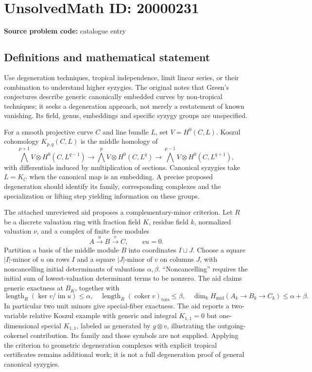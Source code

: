 \documentclass[11pt]{article}
\begin{document}
\section*{UnsolvedMath ID: 20000231}
\textbf{Source problem code:} catalogue entry
\subsection{Definitions and mathematical statement}
Use degeneration techniques, tropical independence, limit linear series, or their combination to understand higher syzygies. The original notes that Green's conjectures describe generic canonically embedded curves by non-tropical techniques; it seeks a degeneration approach, not merely a restatement of known vanishing. Its field, genus, embeddings and specific syzygy groups are unspecified.

For a smooth projective curve $C$ and line bundle $L$, set $V=H^0(C,L)$. Koszul cohomology $K_{p,q}(C,L)$ is the middle homology of
\[
\bigwedge^{p+1}V\otimes H^0(C,L^{q-1})\longrightarrow
\bigwedge^pV\otimes H^0(C,L^q)\longrightarrow
\bigwedge^{p-1}V\otimes H^0(C,L^{q+1}),
\]
with differentials induced by multiplication of sections. Canonical syzygies take $L=K_C$ when the canonical map is an embedding. A precise proposed degeneration should identify its family, corresponding complexes and the specialization or lifting step yielding information on these groups.

The attached unreviewed aid proposes a complementary-minor criterion. Let $R$ be a discrete valuation ring with fraction field $K$, residue field $k$, normalized valuation $\nu$, and a complex of finite free modules
\[
A\xrightarrow{u}B\xrightarrow{v}C,\qquad vu=0.
\]
Partition a basis of the middle module $B$ into coordinates $I\sqcup J$. Choose a square $|I|$-minor of $u$ on rows $I$ and a square $|J|$-minor of $v$ on columns $J$, with noncancelling initial determinants of valuations $\alpha,\beta$. ``Noncancelling'' requires the initial sum of lowest-valuation determinant terms to be nonzero. The aid claims generic exactness at $B_K$, together with
\[
\operatorname{length}_R(\ker v/\operatorname{im}u)\le\alpha,\quad
\operatorname{length}_R(\operatorname{coker}v)_{\mathrm{tors}}\le\beta,\quad
\dim_k H_{\mathrm{mid}}(A_k\to B_k\to C_k)\le\alpha+\beta.
\]
In particular two unit minors give special-fiber exactness. The aid reports a two-variable relative Koszul example with generic and integral $K_{1,1}=0$ but one-dimensional special $K_{1,1}$, labeled as generated by $y\otimes v$, illustrating the outgoing-cokernel contribution. Its family and those symbols are not supplied. Applying the criterion to geometric degeneration complexes with explicit tropical certificates remains additional work; it is not a full degeneration proof of general canonical syzygies.
\end{document}
